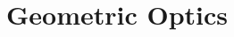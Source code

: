 \documentclass[../book.tex]{subfiles}
\begin{document}
\chapter{Geometric Optics}
\label{ch:geometric-optics}

















\chapterbib
\end{document}
